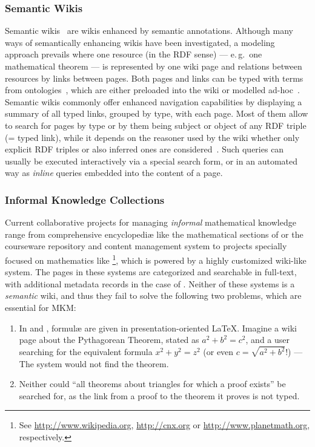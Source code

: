 \subsubsection{Semantic Wikis}
\label{sec:semwiki}

Semantic wikis~\cite{semwiki06} are wikis enhanced by semantic annotations.  Although many
ways of semantically enhancing wikis have been investigated, a modeling approach prevails
where one resource (in the RDF sense) --- e.\,g.\ one mathematical theorem --- is
represented by one wiki page and relations between resources by links between pages.  Both
pages and links can be typed with terms from
ontologies~\cite{OrDeMoVoHa06:annotation-navigation-semwiki}, which are either preloaded
into the wiki or modelled ad-hoc~\cite{KrSchVr:semwiki-reasoning07}.  Semantic wikis
commonly offer enhanced navigation capabilities by displaying a summary of all typed
links, grouped by type, with each page.  Most of them allow to search for pages by type or
by them being subject or object of any RDF triple (= typed link), while it depends on the
reasoner used by the wiki whether only explicit RDF triples or also inferred ones are
considered~\cite{KrSchVr:semwiki-reasoning07}.  Such queries can usually be executed
interactively via a special search form, or in an automated way as \emph{inline} queries
embedded into the content of a page.

\subsubsection{Informal Knowledge Collections}
\label{sec:math-knowledge-collections}

Current collaborative projects for managing \emph{informal} mathematical knowledge range
from comprehensive encyclopediæ like the mathematical sections of  or
the courseware repository and content management system  to projects
specially focused on mathematics like \footnote{See
  \url{http://www.wikipedia.org}, \url{http://cnx.org} or \url{http://www.planetmath.org},
  respectively.}, which is powered by a highly customized wiki-like system.  The pages in
these systems are categorized and searchable in full-text, with additional metadata
records in the case of .  Neither of these systems is a
\emph{semantic} wiki, and thus they fail to solve the following two problems, which are
essential for MKM:

\begin{enumerate}
\item\label{item:formula-search-usecase} In  and ,
  formulæ are given in presentation-oriented {\LaTeX}.  Imagine a wiki page about the
  Pythagorean Theorem, stated as $a^2 + b^2 = c^2$, and a user searching for the
  equivalent formula $x^2 + y^2 = z^2$ (or even $c=\sqrt{a^2+b^2}$!) --- The system would
  not find the theorem.
\item Neither could ``all theorems about triangles for which a
  proof exists'' be searched for, as the link from a proof to the theorem it proves is not
  typed.
\end{enumerate}

